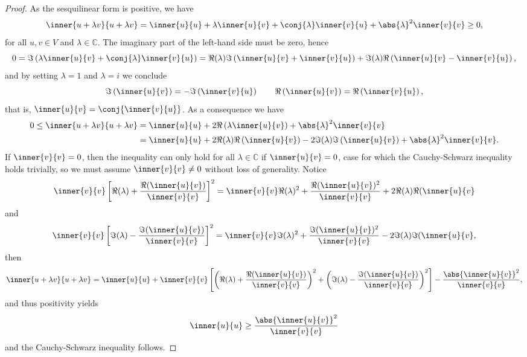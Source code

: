\begin{proof}
    As the sesquilinear form is positive, we have
    \begin{equation*}
        \inner{u+\lambda v}{u + \lambda v} = \inner{u}{u} + \lambda \inner{u}{v} + \conj{\lambda} \inner{v}{u} + \abs{\lambda}^2\inner{v}{v} \geq 0,
    \end{equation*}
    for all \(u,v \in V\) and \(\lambda \in \mathbb{C}\). The imaginary part of the left-hand side must be zero, hence
    \begin{equation*}
        0 = \Im\left(\lambda \inner{u}{v} + \conj{\lambda} \inner{v}{u}\right) = \Re(\lambda) \Im\left(\inner{u}{v} + \inner{v}{u}\right) + \Im(\lambda)\Re\left(\inner{u}{v} - \inner{v}{u}\right),
    \end{equation*}
    and by setting \(\lambda = 1\) and \(\lambda = i\) we conclude
    \begin{equation*}
        \Im\left(\inner{u}{v}\right) = - \Im\left(\inner{v}{u}\right)
        \quad\text\quad
        \Re\left(\inner{u}{v}\right) = \Re\left(\inner{v}{u}\right),
    \end{equation*}
    that is, \(\inner{u}{v} = \conj{\inner{v}{u}}\). As a consequence we have
    \begin{align*}
        0 \leq \inner{u+\lambda v}{u + \lambda v} &= \inner{u}{u} + 2 \Re\left(\lambda \inner{u}{v}\right) + \abs{\lambda}^2\inner{v}{v}\\
                                                  &= \inner{u}{u} + 2 \Re(\lambda) \Re\left(\inner{u}{v}\right) - 2 \Im(\lambda) \Im\left(\inner{u}{v}\right) + \abs{\lambda}^2 \inner{v}{v}.
    \end{align*}
    If \(\inner{v}{v} = 0\), then the inequality can only hold for all \(\lambda\in \mathbb{C}\) if \(\inner{u}{v} = 0\), case for which the Cauchy-Schwarz inequality holds trivially, so we must assume \(\inner{v}{v} \neq 0\) without loss of generality. Notice
    \begin{equation*}
        \inner{v}{v}\left[\Re(\lambda) + \frac{\Re(\inner{u}{v})}{\inner{v}{v}}\right]^2 = \inner{v}{v} \Re(\lambda)^2 + \frac{\Re(\inner{u}{v})^2}{\inner{v}{v}} + 2\Re(\lambda) \Re(\inner{u}{v}
    \end{equation*}
    and
    \begin{equation*}
        \inner{v}{v}\left[\Im(\lambda) - \frac{\Im(\inner{u}{v})}{\inner{v}{v}}\right]^2 = \inner{v}{v} \Im(\lambda)^2 + \frac{\Im(\inner{u}{v})^2}{\inner{v}{v}} - 2\Im(\lambda) \Im(\inner{u}{v},
    \end{equation*}
    then
    \begin{equation*}
        \inner{u+\lambda v}{u + \lambda v} = \inner{u}{u} + \inner{v}{v}\left[\left(\Re(\lambda) + \frac{\Re(\inner{u}{v})}{\inner{v}{v}}\right)^2 + \left(\Im(\lambda) - \frac{\Im(\inner{u}{v})}{\inner{v}{v}}\right)^2\right] - \frac{\abs{\inner{u}{v}}^2}{\inner{v}{v}},
    \end{equation*}
    and thus positivity yields
    \begin{equation*}
        \inner{u}{u} \geq \frac{\abs{\inner{u}{v}}^2}{\inner{v}{v}}
    \end{equation*}
    and the Cauchy-Schwarz inequality follows.
\end{proof}
